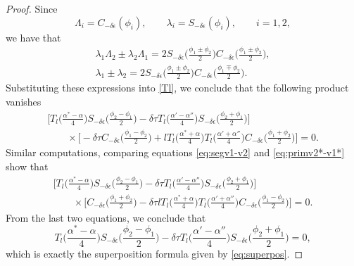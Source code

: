 \documentclass[10pt,a4paper]{amsart}
\numberwithin{equation}{section}
\begin{document}
\begin{proof}
Since
\[
\Lambda_i=C_{-\delta\epsilon}(\phi_i) , \qquad \lambda_i=S_{-\delta\epsilon}(\phi_i), \qquad i=1,2,
\]
we have that
\begin{gather*}
\lambda_1\Lambda_2\pm\lambda_2\Lambda_1=2
S_{-\delta\epsilon}\biggl(\frac{\phi_1\pm \phi_2}{2}\biggr)C_{-\delta\epsilon}\biggl(\frac{\phi_1\pm \phi_2}{2}\biggr),
\\
\lambda_1\pm\lambda_2= 2 S_{-\delta\epsilon}\biggl(\frac{\phi_1\pm \phi_2}{2}\biggr)
C_{-\delta\epsilon}\biggl(\frac{\phi_1\mp \phi_2}{2}\biggr).
\end{gather*}
Substituting these expressions into \eqref{Tl}, we conclude that the following product vanishes
\begin{gather*}
 \biggl[T_l\biggl(\frac{\alpha^*-\alpha}{4}\biggr) S_{-\delta\epsilon}\biggl(\frac{\phi_2-\phi_1}{2}\biggr)-\delta\tau
T_l\biggl(\frac{\alpha'-\alpha''}{4}\biggr) S_{-\delta\epsilon}\biggl(\frac{\phi_2+\phi_1}{2}\biggr)\biggr] \\
 \qquad{}\times\biggl[ -\delta\tau C_{-\delta\epsilon}\biggl(\frac{\phi_1-\phi_2}{2}\biggr)+l T_l\biggl(\frac{\alpha^*+\alpha}{4}\biggr)
T_l\biggl(\frac{\alpha'+\alpha''}{4}\biggr) C_{-\delta\epsilon}\biggl(\frac{\phi_1+\phi_2}{2}\biggr) \biggr]=0.
\end{gather*}
Similar computations, comparing equations \eqref{eq:segv1-v2} and \eqref{eq:primv2*-v1*}
show that
\begin{gather*}
 \biggl[T_l\biggl(\frac{\alpha^*-\alpha}{4}\biggr) S_{-\delta\epsilon}\biggl(\frac{\phi_2-\phi_1}{2}\biggr)-\delta\tau
T_l\biggl(\frac{\alpha'-\alpha''}{4}\biggr) S_{-\delta\epsilon}\biggl(\frac{\phi_2+\phi_1}{2}\biggr)\biggr] \\
 \qquad{}\times\biggl[ C_{-\delta\epsilon}\biggl(\frac{\phi_1+\phi_2}{2}\biggr)-\delta\tau l T_l\biggl(\frac{\alpha^*+\alpha}{4}\biggr)
T_l\biggl(\frac{\alpha'+\alpha''}{4}\biggr) C_{-\delta\epsilon}\biggl(\frac{\phi_1-\phi_2}{2}\biggr) \biggr]=0.
\end{gather*}
From the last two equations, we conclude that
\[
T_l\biggl(\frac{\alpha^*-\alpha}{4}\biggr) S_{-\delta\epsilon}\biggl(\frac{\phi_2-\phi_1}{2}\biggr)-\delta\tau
T_l\biggl(\frac{\alpha'-\alpha''}{4}\biggr) S_{-\delta\epsilon}\biggl(\frac{\phi_2+\phi_1}{2}\biggr)=0,
\]
which is exactly the superposition formula given by \eqref{eq:superpos}.


\end{proof}
\end{document}
